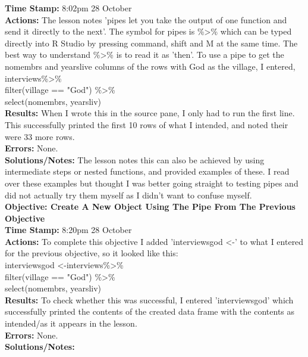 \documentclass{article}
\begin{document}
\begin{FlushLeft}
\textbf{Time Stamp:} 8:02pm 28 October\\
\textbf{Actions:} The lesson notes 'pipes let you take the output of one function and send it directly to the next'. The symbol for pipes is \%\textgreater\% which can be typed directly into R Studio by pressing command, shift and M at the same time. The best way to understand \%\textgreater\%  is to read it as 'then'. To use a pipe to get the no\textunderscore membrs and years\textunderscore live columns of the rows with God as the village, I entered,\\
interviews\%\textgreater\% \\
filter(village == "God") \%\textgreater\% \\
select(no\textunderscore membrs, years\textunderscore liv)\\
\textbf{Results:} When I wrote this in the source pane, I only had to run the first line. This successfully printed the first 10 rows of what I intended, and noted their were 33 more rows.\\
\textbf{Errors:} None.\\
\textbf{Solutions/Notes:} The lesson notes this can also be achieved by using intermediate steps or nested functions, and provided examples of these. I read over these examples but thought I was better going straight to testing pipes and did not actually try them myself as I didn't want to confuse myself.\\
\vspace{5mm}
\textbf{Objective: Create A New Object Using The Pipe From The Previous Objective}\\ 
\textbf{Time Stamp:} 8:20pm 28 October\\
\textbf{Actions:} To complete this objective I added 'interviews\textunderscore god \textless -' to what I entered for the previous objective, so it looked like this:\\
interviews\textunderscore god \textless -interviews\%\textgreater\% \\
filter(village == "God") \%\textgreater\% \\
select(no\textunderscore membrs, years\textunderscore liv)\\
\textbf{Results:} To check whether this was successful, I entered 'interviews\textunderscore god' which successfully printed the contents of the created data frame with the contents as intended/as it appears in the lesson.\\
\textbf{Errors:} None.\\
\textbf{Solutions/Notes:}\\

\end{FlushLeft}
\end{document}
